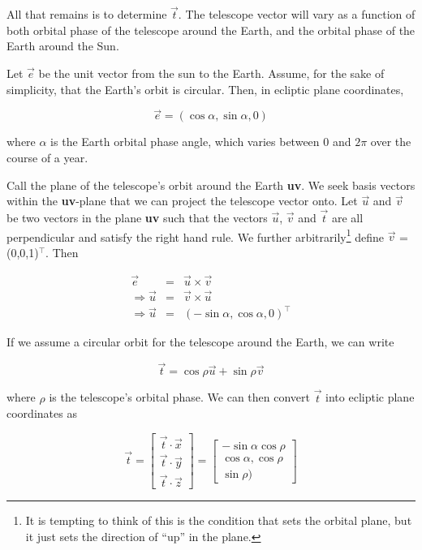 \documentclass[11pt]{article}
\renewcommand{\hat}[1]{\ensuremath{\vec{#1}}}
\begin{document}
All that remains is to determine \hat{t}. The telescope vector will vary as a function of both orbital phase of the telescope around the Earth, and the orbital phase of the Earth around the Sun.



Let \hat{e} be the unit vector from the sun to the Earth. Assume, for the sake of simplicity, that the Earth's orbit is circular. Then, in ecliptic plane coordinates, 

\begin{equation}
\hat{e} = ( \cos{\alpha}, \sin{\alpha}, 0)
\end{equation}

where $\alpha$ is the Earth orbital phase angle, which varies between 0 and $2\pi$ over the course of a year.

Call the plane of the telescope's orbit around the Earth {\bf uv}. We seek basis vectors within the {\bf uv}-plane that we can project the telescope vector onto.
Let \hat{u} and \hat{v} be two vectors in the plane {\bf uv} such that the vectors \hat{u}, \hat{v} and \hat{t} are all perpendicular and satisfy the right hand rule. We further arbitrarily\footnote{It is tempting to think of this is the condition that sets the orbital plane, but it just sets the direction of ``up'' in the plane.} define \hat{v} = (0,0,1)$^\intercal$. Then

\begin{eqnarray}
\hat{e} &=& \hat{u} \times \hat{v} \\
\Rightarrow \hat{u} &=& \hat{v} \times \hat{u} \\
\Rightarrow \hat{u} &=& (-\sin{\alpha}, \cos{\alpha}, 0)^\intercal
\end{eqnarray}



If we assume a circular orbit for the telescope around the Earth, we can write 

\begin{equation}
\hat{t} = \cos{\rho} \hat{u} + \sin{\rho} \hat{v}
\end{equation}

where $\rho$ is the telescope's orbital phase. We can then convert \hat{t} into ecliptic plane coordinates as 

\begin{equation}
\hat{t} = 
    \begin{bmatrix}
    \hat{t} \cdot \hat{x} \\
    \hat{t} \cdot \hat{y} \\
    \hat{t} \cdot  \hat{z}
    \end{bmatrix} 
    =
    \begin{bmatrix}
    -\sin{\alpha} \cos{\rho} \\
    \cos{\alpha}, \cos{\rho} \\
    \sin{\rho})
    \end{bmatrix}
\end{equation}
    
\end{document}
